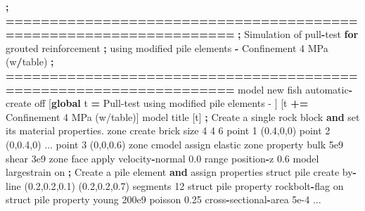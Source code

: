 \documentclass[a4paper, nobind]{templates/ociamthesis}
\newenvironment{Shaded}{\begin{snugshade}}{\end{snugshade}}
\newcommand{\BuiltInTok}[1]{#1}
\newcommand{\ControlFlowTok}[1]{\textcolor[rgb]{0.13,0.29,0.53}{\textbf{#1}}}
\newcommand{\DecValTok}[1]{\textcolor[rgb]{0.00,0.00,0.81}{#1}}
\newcommand{\FloatTok}[1]{\textcolor[rgb]{0.00,0.00,0.81}{#1}}
\newcommand{\KeywordTok}[1]{\textcolor[rgb]{0.13,0.29,0.53}{\textbf{#1}}}
\newcommand{\NormalTok}[1]{#1}
\newcommand{\OperatorTok}[1]{\textcolor[rgb]{0.81,0.36,0.00}{\textbf{#1}}}
\newcommand{\StringTok}[1]{\textcolor[rgb]{0.31,0.60,0.02}{#1}}
\renewenvironment{Shaded}
{
  \vspace{10pt}%
  \begin{snugshade}%
}{%
  \end{snugshade}%
  \vspace{8pt}%
}
\begin{document}
\begin{Shaded}
\begin{Highlighting}[]
    \OperatorTok{;} \OperatorTok{==================================================================}
    \OperatorTok{;}\NormalTok{   Simulation of pull}\OperatorTok{{-}}\NormalTok{test }\ControlFlowTok{for}\NormalTok{ grouted reinforcement}
    \OperatorTok{;}\NormalTok{   using modified pile elements }\OperatorTok{{-}}\NormalTok{ Confinement }\DecValTok{4}\NormalTok{ MPa (w}\OperatorTok{/}\NormalTok{table)}
    \OperatorTok{;} \OperatorTok{==================================================================}
\NormalTok{    model new}
\NormalTok{    fish automatic}\OperatorTok{{-}}\NormalTok{create off}
\NormalTok{    [}\KeywordTok{global}\NormalTok{ t }\OperatorTok{=}  \StringTok{\textquotesingle{}Pull{-}test using modified pile elements {-} \textquotesingle{}}\NormalTok{]}
\NormalTok{    [t }\OperatorTok{+=} \StringTok{\textquotesingle{}Confinement 4 MPa (w/table)\textquotesingle{}}\NormalTok{]}
\NormalTok{    model title [t]}
    \OperatorTok{;}\NormalTok{ Create a single rock block }\KeywordTok{and} \BuiltInTok{set}\NormalTok{ its material properties.}
\NormalTok{    zone create brick size }\DecValTok{4} \DecValTok{4} \DecValTok{6}\NormalTok{ point }\DecValTok{1}\NormalTok{ (}\FloatTok{0.4}\NormalTok{,}\DecValTok{0}\NormalTok{,}\DecValTok{0}\NormalTok{) point }\DecValTok{2}\NormalTok{ (}\DecValTok{0}\NormalTok{,}\FloatTok{0.4}\NormalTok{,}\DecValTok{0}\NormalTok{) ...}
\NormalTok{                                 point }\DecValTok{3}\NormalTok{ (}\DecValTok{0}\NormalTok{,}\DecValTok{0}\NormalTok{,}\FloatTok{0.6}\NormalTok{)}
\NormalTok{    zone cmodel assign elastic}
\NormalTok{    zone }\BuiltInTok{property}\NormalTok{ bulk }\FloatTok{5e9}\NormalTok{ shear }\FloatTok{3e9}
\NormalTok{    zone face }\BuiltInTok{apply}\NormalTok{ velocity}\OperatorTok{{-}}\NormalTok{normal }\FloatTok{0.0} \BuiltInTok{range}\NormalTok{ position}\OperatorTok{{-}}\NormalTok{z }\FloatTok{0.6}
\NormalTok{    model largestrain on}
    \OperatorTok{;}\NormalTok{ Create a pile element }\KeywordTok{and}\NormalTok{ assign properties}
\NormalTok{    struct pile create by}\OperatorTok{{-}}\NormalTok{line (}\FloatTok{0.2}\NormalTok{,}\FloatTok{0.2}\NormalTok{,}\FloatTok{0.1}\NormalTok{) (}\FloatTok{0.2}\NormalTok{,}\FloatTok{0.2}\NormalTok{,}\FloatTok{0.7}\NormalTok{) segments }\DecValTok{12}
\NormalTok{    struct pile }\BuiltInTok{property}\NormalTok{ rockbolt}\OperatorTok{{-}}\NormalTok{flag on}
\NormalTok{    struct pile }\BuiltInTok{property}\NormalTok{ young }\FloatTok{200e9}\NormalTok{ poisson }\FloatTok{0.25}\NormalTok{ cross}\OperatorTok{{-}}\NormalTok{sectional}\OperatorTok{{-}}\NormalTok{area }\FloatTok{5e{-}4}\NormalTok{ ...}

\end{Highlighting}
\end{Shaded}
\end{document}
